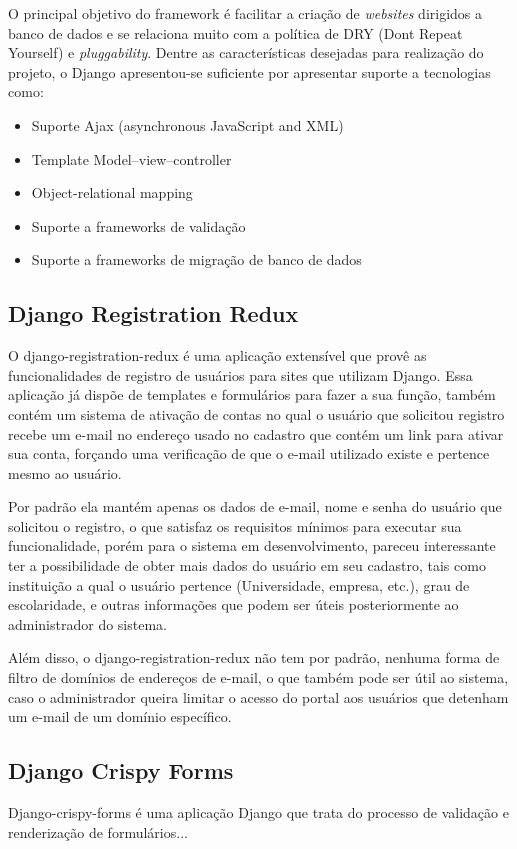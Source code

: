 \documentclass[tg]{mdtufsm}
\begin{document}
O principal objetivo do framework é facilitar a criação de \emph{websites} dirigidos a banco de dados e se relaciona muito com a política de DRY (Dont Repeat Yourself) e \emph{pluggability}. Dentre as características desejadas para realização do projeto, o Django apresentou-se suficiente por apresentar suporte a tecnologias como:
\begin{itemize}
	\item Suporte Ajax (asynchronous JavaScript and XML)
	\item Template Model–view–controller
	\item Object-relational mapping
	\item Suporte a frameworks de validação
	\item Suporte a frameworks de migração de banco de dados
\end{itemize}

\subsection{Django Registration Redux}
O django-registration-redux é uma aplicação extensível que provê as funcionalidades de registro de usuários para sites que utilizam Django. Essa aplicação já dispõe de templates e formulários para fazer a sua função, também contém um sistema de ativação de contas no qual o usuário que solicitou registro recebe um e-mail no endereço usado no cadastro que contém um link para ativar sua conta, forçando uma verificação de que o e-mail utilizado existe e pertence mesmo ao usuário.

Por padrão ela mantém apenas os dados de e-mail, nome e senha do usuário que solicitou o registro, o que satisfaz os requisitos mínimos para executar sua funcionalidade, porém para o sistema em desenvolvimento, pareceu interessante ter a possibilidade de obter mais dados do usuário em seu cadastro, tais como instituição a qual o usuário pertence (Universidade, empresa, etc.), grau de escolaridade, e outras informações que podem ser úteis posteriormente ao administrador do sistema.

Além disso, o django-registration-redux não tem por padrão, nenhuma forma de filtro de domínios de endereços de e-mail, o que também pode ser útil ao sistema, caso o administrador queira limitar o acesso do portal aos usuários que detenham um e-mail de um domínio específico.
\subsection{Django Crispy Forms}
Django-crispy-forms é uma aplicação Django que trata do processo de validação e renderização de formulários...

\end{document}
